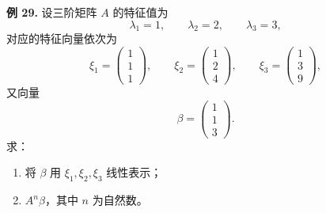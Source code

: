 \begin{problemblock}
\textbf{例 29.} 设三阶矩阵 \(A\) 的特征值为
\[
\lambda_1=1,\qquad \lambda_2=2,\qquad \lambda_3=3,
\]
对应的特征向量依次为
\[
\xi_1=\begin{pmatrix}1\\1\\1\end{pmatrix},\qquad
\xi_2=\begin{pmatrix}1\\2\\4\end{pmatrix},\qquad
\xi_3=\begin{pmatrix}1\\3\\9\end{pmatrix},
\]
又向量
\[
\beta=\begin{pmatrix}1\\1\\3\end{pmatrix}.
\]
求：
\begin{enumerate}[label=(\arabic*)]
\item 将 \(\beta\) 用 \(\xi_1,\xi_2,\xi_3\) 线性表示；
\item \(A^n\beta\)，其中 \(n\) 为自然数。
\end{enumerate}
\end{problemblock}
